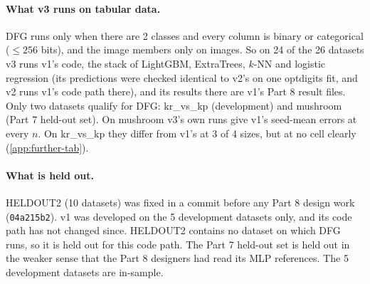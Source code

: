 \paragraph{What v3 runs on tabular data.} DFG runs only when there are 2 classes and every column is binary or categorical ($\le256$ bits), and the image members only on images. So on 24 of the 26 datasets v3 runs v1's code, the stack of LightGBM, ExtraTrees, $k$-NN and logistic regression (its predictions were checked identical to v2's on one optdigits fit, and v2 runs v1's code path there), and its results there are v1's Part 8 result files. Only two datasets qualify for DFG: kr\_vs\_kp (development) and mushroom (Part 7 held-out set). On mushroom v3's own runs give v1's seed-mean errors at every $n$. On kr\_vs\_kp they differ from v1's at 3 of 4 sizes, but at no cell clearly (\cref{app:further-tab}).

\paragraph{What is held out.} HELDOUT2 (10 datasets) was fixed in a commit before any Part 8 design work (\texttt{04a215b2}). v1 was developed on the 5 development datasets only, and its code path has not changed since. HELDOUT2 contains no dataset on which DFG runs, so it is held out for this code path. The Part 7 held-out set is held out in the weaker sense that the Part 8 designers had read its MLP references. The 5 development datasets are in-sample.

\begin{table}[t]
\centering{\footnotesize\setlength{\tabcolsep}{4pt}
}
\caption{v3 on the tabular datasets against the MLP references and  . ``Cells'': the $(\text{dataset},n)$ pairs compared, each a mean over 3 seeds, with the verdict rule of \cref{sec:metrics}. ``Mean $\log_2$ ratio'': of v3's test error to the reference's, over cells, errors floored at 0.002. The last column counts the datasets whose mean ratio over $n$ is below 0, with the two-sided sign-test $p$.  is the per-cell best of the Part 7--8 MLP variants (hindsight).  was run on the Part 7 set only at $n\le10000$ (54 of 59 cells) and not on the development sets. On 24 of the 26 datasets v3's code path is v1's, so these are Part 8's numbers, except for v3's own runs on mushroom (identical errors) and kr\_vs\_kp. Source: .}
\label{tab:real}
\end{table}

